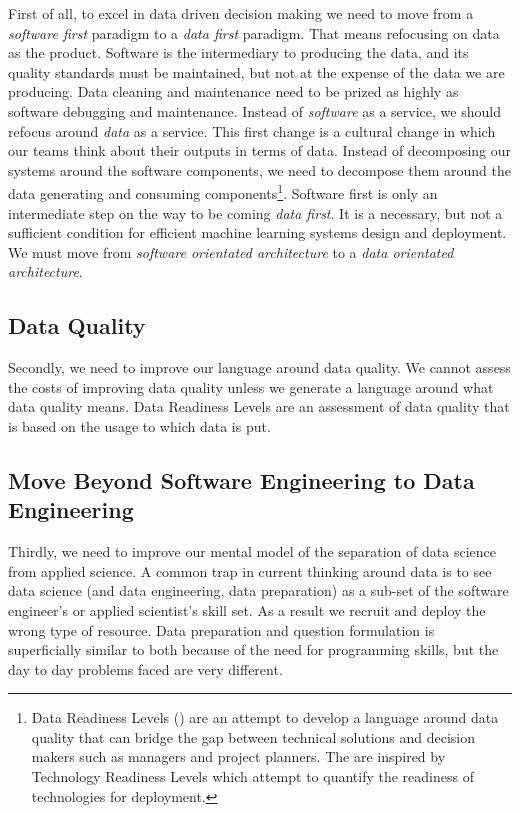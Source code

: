 \documentclass[a4paper]{caesar_book}
\begin{document}
First of all, to excel in data driven decision making we need to move from a \textit{software first} paradigm to a \textit{data first} paradigm. That means refocusing on data as the product. Software is the intermediary to producing the data, and its quality standards must be maintained, but not at the expense of the data we are producing. Data cleaning and maintenance need to be prized as highly as software debugging and maintenance. Instead of \textit{software} as a service, we should refocus around \textit{data} as a service. This first change is a cultural change in which our teams think about their outputs in terms of data. Instead of decomposing our systems around the software components, we need to decompose them around the data generating and consuming components\footnote{Data Readiness Levels (\cite{Lawrence2017DataRL}) are an attempt to develop a language around data quality that can bridge the gap between technical solutions and decision makers such as managers and project planners. The are inspired by Technology Readiness Levels which attempt to quantify the readiness of technologies for deployment.}. Software first is only an intermediate step on the way to be coming \textit{data first}. It is a necessary, but not a sufficient condition for efficient machine learning systems design and deployment. We must move from \textit{software orientated architecture} to a \textit{data orientated architecture}.

\subsection{Data Quality}

Secondly, we need to improve our language around data quality. We cannot assess the costs of improving data quality unless we generate a language around what data quality means. Data Readiness Levels  are an assessment of data quality that is based on the usage to which data is put.

\subsection{Move Beyond Software Engineering to Data Engineering}

Thirdly, we need to improve our mental model of the separation of data science from applied science. A common trap in current thinking around data is to see data science (and data engineering, data preparation) as a sub-set of the software engineer’s or applied scientist’s skill set. As a result we recruit and deploy the wrong type of resource. Data preparation and question formulation is superficially similar to both because of the need for programming skills, but the day to day problems faced are very different.
\end{document}

